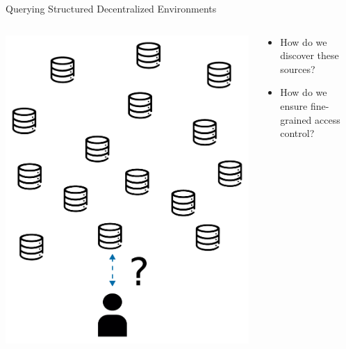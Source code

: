 \begin{frame}{Querying Structured Decentralized Environments}
    \begin{columns}[T] %
        \begin{column}{0.6\textwidth} 
            \centering%
            \includegraphics[width=.6\linewidth]{images/how-to-find-sources.pdf} %
        \end{column}

        \begin{column}{0.4\textwidth} %
            \begin{itemize}
                \item How do we discover these sources?
                \item How do we ensure fine-grained access control?
            \end{itemize}
        \end{column}
    \end{columns}
\end{frame}

